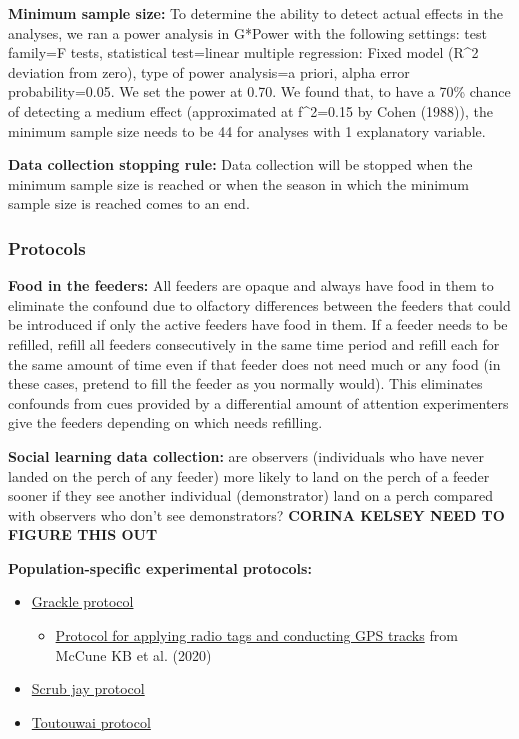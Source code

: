 \documentclass[
]{article}
\providecommand{\tightlist}{%
  \setlength{\itemsep}{0pt}\setlength{\parskip}{0pt}}
\begin{document}
\textbf{Minimum sample size:} To determine the ability to detect actual
effects in the analyses, we ran a power analysis in G*Power with the
following settings: test family=F tests, statistical test=linear
multiple regression: Fixed model (R\^{}2 deviation from zero), type of
power analysis=a priori, alpha error probability=0.05. We set the power
at 0.70. We found that, to have a 70\% chance of detecting a medium
effect (approximated at f\^{}2=0.15 by Cohen (1988)), the minimum sample
size needs to be 44 for analyses with 1 explanatory variable.

\textbf{Data collection stopping rule:} Data collection will be stopped
when the minimum sample size is reached or when the season in which the
minimum sample size is reached comes to an end.

\hypertarget{protocols-1}{%
\subsubsection{Protocols}\label{protocols-1}}

\textbf{Food in the feeders:} All feeders are opaque and always have
food in them to eliminate the confound due to olfactory differences
between the feeders that could be introduced if only the active feeders
have food in them. If a feeder needs to be refilled, refill all feeders
consecutively in the same time period and refill each for the same
amount of time even if that feeder does not need much or any food (in
these cases, pretend to fill the feeder as you normally would). This
eliminates confounds from cues provided by a differential amount of
attention experimenters give the feeders depending on which needs
refilling.

\textbf{Social learning data collection:} are observers (individuals who
have never landed on the perch of any feeder) more likely to land on the
perch of a feeder sooner if they see another individual (demonstrator)
land on a perch compared with observers who don't see demonstrators?
\textbf{CORINA KELSEY NEED TO FIGURE THIS OUT}

\textbf{Population-specific experimental protocols:}

\begin{itemize}
\tightlist
\item
  \href{https://docs.google.com/document/d/1pTrcy7ztgYVSAP7rGA6Y_lAmZ7hK_-mB01zwy0oKh7w/edit?usp=sharing}{Grackle
  protocol}

  \begin{itemize}
  \tightlist
  \item
    \href{https://docs.google.com/document/d/1ZOpkdxy5-wiGg7hYod-XaaBoOl53DsVQ3pwWoIdvrzk/edit?usp=sharing}{Protocol
    for applying radio tags and conducting GPS tracks} from McCune KB et
    al. (2020)
  \end{itemize}
\item
  \href{https://docs.google.com/document/d/1VWL7AIDB-Z1vhs1dEM7JACHuvNjgjZCBI3ubQECqm2U/edit?usp=sharing}{Scrub
  jay protocol}
\item
  \href{https://docs.google.com/document/d/1U11MpcGd6_dQmgv4jP127KklD7gpAQR--yOtWGMpFXw/edit?usp=sharing}{Toutouwai
  protocol}
\end{itemize}
\end{document}
